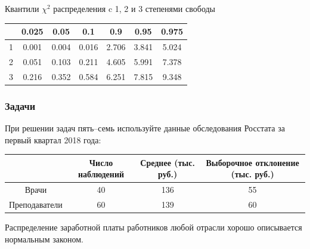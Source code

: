 	\begin{center}
	Квантили $\chi^2$ распределения c 1, 2 и 3 степенями свободы\\
		\begin{tabular}{c|cccccc}
			\toprule
			& 0.025 & 0.05 & 0.1 & 0.9 & 0.95 & 0.975\\
			\midrule
							1 & 0.001 & 0.004 & 0.016 & 2.706 & 3.841 & 5.024 \\
							2 & 0.051 & 0.103 & 0.211 & 4.605 & 5.991 & 7.378 \\
							3 & 0.216 & 0.352 & 0.584 & 6.251 & 7.815 & 9.348 \\
			\bottomrule
		\end{tabular}
	\end{center}

\newpage

\subsubsection*{Задачи}

При решении задач пять–семь используйте данные обследования Росстата за первый квартал 2018 года:

	\begin{center}
		\begin{tabular}{c|ccc}
			\toprule
			& Число наблюдений & Среднее (тыс. руб.) & Выборочное отклонение (тыс. руб.) \\
			\midrule
							Врачи & 40 & 136 & 55  \\
							Преподаватели & 60 & 139 & 60 \\
			\bottomrule
		\end{tabular}
	\end{center}

Распределение заработной платы работников любой отрасли хорошо описывается нормальным законом.

